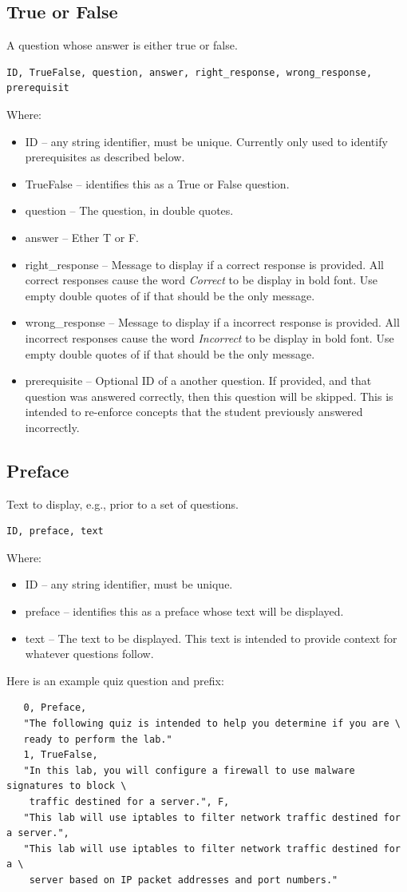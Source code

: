 \documentclass[12pt]{article}
\begin{document}
\subsection{True or False}
A question whose answer is either true or false.
\begin{verbatim}
ID, TrueFalse, question, answer, right_response, wrong_response, prerequisit
\end{verbatim}
\noindent Where:
\begin{itemize}
\item ID -- any string identifier, must be unique.  Currently only used to identify prerequisites as described below.
\item TrueFalse -- identifies this as a True or False question.
\item question -- The question, in double quotes.
\item answer -- Ether T or F.
\item right\_response -- Message to display if a correct response is provided.  All correct responses cause the word
\textit{Correct} to be display in bold font.   Use empty double quotes of if that should be the only message.
\item wrong\_response -- Message to display if a incorrect response is provided.  All incorrect responses cause the word
\textit{Incorrect} to be display in bold font.   Use empty double quotes of if that should be the only message.
\item prerequisite -- Optional ID of a another question.  If provided, and that question was answered correctly, then
this question will be skipped.  This is intended to re-enforce concepts that the student previously answered incorrectly.
\end{itemize}
\subsection{Preface}
Text to display, e.g., prior to a set of questions.
\begin{verbatim}
ID, preface, text
\end{verbatim}
\noindent Where:
\begin{itemize}
\item ID -- any string identifier, must be unique.  
\item preface -- identifies this as a preface whose text will be displayed.
\item text -- The text to be displayed.  This text is intended to provide context for whatever questions follow.
\end{itemize}
Here is an example quiz question and prefix:
\begin{verbatim}
   0, Preface, 
   "The following quiz is intended to help you determine if you are \
   ready to perform the lab."
   1, TrueFalse, 
   "In this lab, you will configure a firewall to use malware signatures to block \
    traffic destined for a server.", F,
   "This lab will use iptables to filter network traffic destined for a server.",
   "This lab will use iptables to filter network traffic destined for a \
    server based on IP packet addresses and port numbers."
\end{verbatim}
\end{document}
